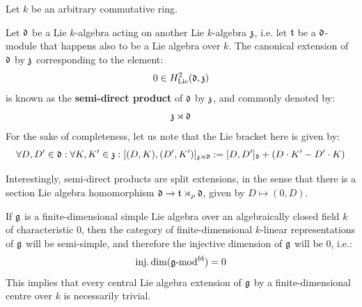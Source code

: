         \begin{example}
            Let $k$ be an arbitrary commutative ring. 
            
            Let $\mathfrak{d}$ be a Lie $k$-algebra acting on another Lie $k$-algebra $\mathfrak{z}$, i.e. let $\mathfrak{t}$ be a $\mathfrak{d}$-module that happens also to be a Lie algebra over $k$. The canonical extension of $\mathfrak{d}$ by $\mathfrak{z}$ corresponding to the element:
                $$0 \in H^2_{\mathrm{Lie}}(\mathfrak{d}, \mathfrak{z})$$
            is known as the \textbf{semi-direct product} of $\mathfrak{d}$ by $\mathfrak{z}$, and commonly denoted by:
                $$\mathfrak{z} \rtimes \mathfrak{d}$$
            For the sake of completeness, let us note that the Lie bracket here is given by:
                $$\forall D, D' \in \mathfrak{d}: \forall K, K' \in \mathfrak{z}: [ (D, K), (D', K') ]_{\mathfrak{z} \rtimes \mathfrak{d}} := [D, D']_{\mathfrak{d}} + ( D \cdot K' - D' \cdot K )$$
            
            Interestingly, semi-direct products are split extensions, in the sense that there is a section Lie algebra homomorphism $\mathfrak{d} \to \mathfrak{t} \rtimes_{\rho} \mathfrak{d}$, given by $D \mapsto (0, D)$.
        \end{example}
        \begin{example}
            If $\mathfrak{g}$ is a finite-dimensional simple Lie algebra over an algebraically closed field $k$ of characteristic $0$, then the category of finite-dimensional $k$-linear representations of $\mathfrak{g}$ will be semi-simple, and therefore the injective dimension of $\mathfrak{g}$ will be $0$, i.e.:
                $$\operatorname{inj.dim}(\mathfrak{g}\text{-}\mathrm{mod}^{\mathrm{fd}}) = 0$$
            This implies that every central Lie algebra extension of $\mathfrak{g}$ by a finite-dimensional centre over $k$ is necessarily trivial. 
        \end{example}

